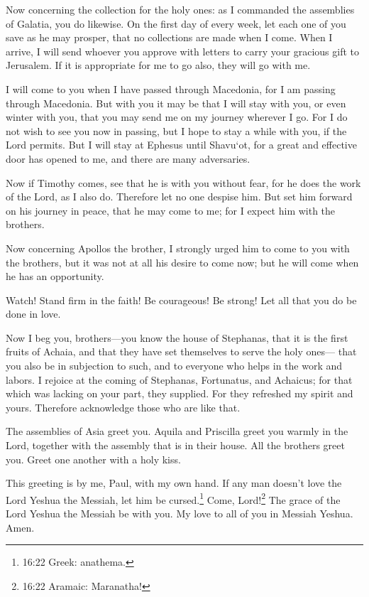 \mychapter{} \myverse*{}Now concerning the collection for the holy ones: as I commanded
the assemblies of Galatia, you do likewise.
\myverse{}On the first day of every week, let each one of you save as he may prosper,
that no collections are made when I come.
\myverse{}When I arrive, I will send whoever you approve with letters to carry your gracious
gift to Jerusalem.
\myverse{}If it is appropriate for me to go also, they will go with me.

\myverse{}I will come to you when I have passed through Macedonia, for I
am passing through Macedonia.
\myverse{}But with you it may be that I will stay with you, or even winter with you,
that you may send me on my journey wherever I go.
\myverse{}For I do not wish to see you now in passing, but I hope to stay a while with
you, if the Lord permits.
\myverse{}But I will stay at Ephesus until Shavu`ot,
\myverse{}for a great and effective door has opened to me, and there are many adversaries.

\myverse{}Now if Timothy comes, see that he is with you without fear,
for he does the work of the Lord, as I also do.
\myverse{}Therefore let no one despise him. But set him forward on his journey in peace,
that he may come to me; for I expect him with the brothers.

\myverse{}Now concerning Apollos the brother, I strongly urged him to
come to you with the brothers, but it was not at all his desire to come now; but he will come when he
has an opportunity.

\myverse{}Watch! Stand firm in the faith! Be courageous! Be strong!
\myverse{}Let all that you do be done in love.

\myverse{}Now I beg you, brothers—you know the house of Stephanas, that
it is the first fruits of Achaia, and that they have set themselves to serve the holy ones—
\myverse{}that you also be in subjection to such, and to everyone who helps in the
work and labors.
\myverse{}I rejoice at the coming of Stephanas, Fortunatus, and Achaicus; for that
which was lacking on your part, they supplied.
\myverse{}For they refreshed my spirit and yours. Therefore acknowledge those who are
like that.

\myverse{}The assemblies of Asia greet you. Aquila and Priscilla greet
you warmly in the Lord, together with the assembly that is in their house.
\myverse{}All the brothers greet you. Greet one another with a holy kiss.

\myverse{}This greeting is by me, Paul, with my own hand.
\myverse{}If any man doesn’t love the Lord Yeshua the Messiah, let him be cursed.\footnote{16:22 Greek: anathema.} Come, Lord!\footnote{16:22 Aramaic: Maranatha!}
\myverse{}The grace of the Lord Yeshua the Messiah be with you.
\myverse{}My love to all of you in Messiah Yeshua. Amen.


